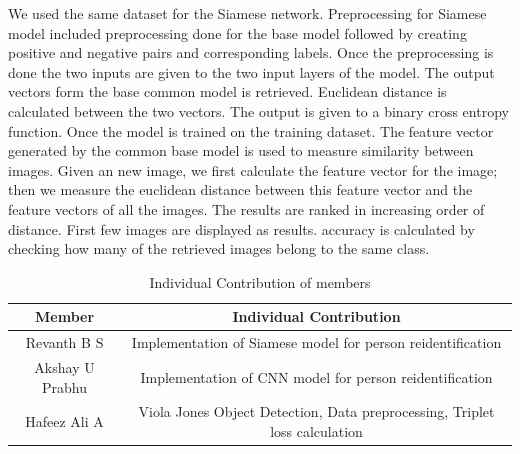 \documentclass{article}[12pt,a4paper]
\begin{document}
We used the same dataset for the Siamese network. Preprocessing for Siamese model included preprocessing done for the base model followed by creating positive and negative pairs and corresponding labels. Once the preprocessing is done the two inputs are given to the two input layers of the model. The output vectors form the base common model is retrieved. Euclidean distance is calculated between the two vectors. The output is given to a binary cross entropy function. Once the model is trained on the training dataset. The feature  vector generated by the common base model is used to measure similarity between images. Given an new image, we first calculate the feature vector for the image; then we measure the euclidean distance between this feature vector and the feature vectors of all the images. The results are ranked in increasing order of distance. First few images are displayed as results. accuracy is calculated by checking how many of the retrieved images belong to the same class.
\begin{table}[b]
    \centering
    \begin{tabular}{|c|c|} \hline
         Member & Individual Contribution \\ \hline
         Revanth B S & Implementation of Siamese model for person reidentification  \\ \hline
         Akshay U Prabhu & Implementation of CNN model for person reidentification \\ \hline
         Hafeez Ali A & Viola Jones Object Detection, Data preprocessing,  Triplet loss calculation \\ \hline
    \end{tabular}
    \caption{Individual Contribution of members}
    \label{tab:my_label}
\end{table}
\newpage
\end{document}
